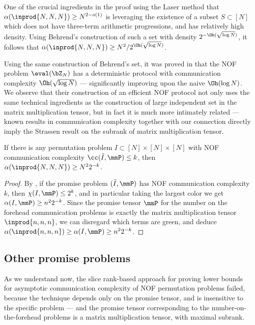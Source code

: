 One of the crucial ingredients in the proof using the Laser method that $\alpha(\inprod{N,N,N}) \geq N^{2 - o(1)}$ is leveraging the existence of a subset $S \subset [N]$ which does not have three-term arithmetic progressions, and has relatively high density. Using Behrend's \cite{behrend} construction of such a set with density $2^{-\Oh(\sqrt{\log N})}$, it follows that $\alpha(\inprod{N,N,N}) \geq N^2/2^{\Oh(\sqrt{\log  N})}$.

Using the same construction of Behrend's set, it was proved in \cite{CFL83} that the NOF problem $\eval(\bZ_N)$ has a deterministic protocol with communication complexity $\Oh(\sqrt{\log N})$ --- significantly improving upon the naive $\Oh(\log N)$. We observe that their construction of an efficient NOF protocol not only uses the same technical ingredients as the construction of large independent set in the matrix multiplication tensor, but in fact it is much more intimately related --- known results in communication complexity together with our connection directly imply the Strassen result on the subrank of matrix multiplication tensor.

\begin{proposition}
\label{fct:qzo-lb}
If there is any permutation problem $I \subset [N]\times [N] \times [N]$ with NOF communication complexity $\cc(\tilde{I}, \mmP) \leq k$, then $\alpha(\inprod{N,N,N}) \geq N^{2} 2^{-k}$.
\end{proposition}
\begin{proof}
    By , if the promise problem $(\tilde{I}, \mmP)$ has NOF communication complexity $k$, then $\chi(I, \mmP) \leq 2^k$, and in particular taking the largest color we get $\alpha(I, \mmP) \geq n^{2} 2^{-k}$. Since the promise tensor $\mmP$ for the number on the forehead communication problems is exactly the matrix multiplication tensor $\inprod{n,n,n}$, we can disregard which terms are green, and deduce $\alpha(\inprod{n,n,n}) \geq \alpha(I, \mmP) \geq n^2 2^{-k}$.
\end{proof}

\subsection{Other promise problems}
As we understand now, the slice rank-based approach for proving lower bounds for asymptotic communication complexity of NOF permutation problems failed, because the technique depends only on the promise tensor, and is insensitive to the specific problem --- and the promise tensor corresponding to the number-on-the-forehead problems is a matrix multiplication tensor, with maximal subrank.

